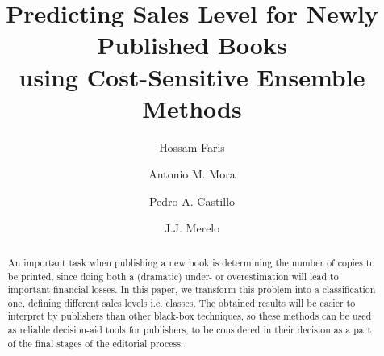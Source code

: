 \documentclass[a4paper,10pt,onecolumn,preprint,3p]{elsarticle}
\begin{document}
\begin{frontmatter}

\title{Predicting Sales Level for Newly Published Books \\
using Cost-Sensitive Ensemble Methods}


\author[abd]{Hossam Faris}
\author[ugrtstc]{Antonio M. Mora}
\author[ugratc]{Pedro A. Castillo}
\author[ugratc]{J.J. Merelo}


\address[abd]{Business Information Technology Department, King Abdullah II School for Information Technology \\
The University of Jordan, Amman, Jordan}
\address[ugrtstc]{Department of Signal Theory, Telematics and Communications, ETSIIT and CITIC \\
University of Granada, Granada, Spain}
\address[ugratc]{Department of Computer Architecture and Computer Technology, ETSIIT and CITIC \\
University of Granada, Granada, Spain}


\begin{abstract}
An important task when publishing a new book is determining the number 
of copies to be printed, since doing both a (dramatic) under- or overestimation will lead to important financial losses.
In this paper, we transform this problem into a classification one, defining different sales levels i.e. classes. 
The obtained results will be easier to interpret by publishers than other black-box techniques, 
so these methods can be used as reliable decision-aid tools for publishers, to be considered in their decision as a part of the final stages of the editorial process.


\end{abstract}
\end{frontmatter}
\end{document}
